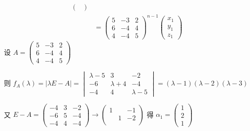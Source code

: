 \begin{align*}
\begin{pmatrix}
			                                                        \end{pmatrix}   \\
			                                   & = \begin{pmatrix}
				                                       5 & -3 & 2 \\
				                                       6 & -4 & 4 \\
				                                       4 & -4 & 5
			                                       \end{pmatrix}^{n-1}\begin{pmatrix}
				                                                          x_{1} \\
				                                                          y_{1} \\
				                                                          z_{1}
			                                                          \end{pmatrix}
		 \end{align*}
		 设 \( A = \begin{pmatrix}
			 5 & -3 & 2 \\
			 6 & -4 & 4 \\
			 4 & -4 & 5
		 \end{pmatrix} \)

		 则 \( f_{A}(\lambda) = |\lambda E - A| = \begin{vmatrix}
			 \lambda-5 & 3         & -2        \\
			 -6        & \lambda+4 & -4        \\
			 -4        & 4         & \lambda-5
		 \end{vmatrix} = (\lambda-1)(\lambda-2)(\lambda-3) \)

		 又 \( E-A = \begin{pmatrix}
			 -4 & 3 & -2 \\
			 -6 & 5 & -4 \\
			 -4 & 4 & -4
		 \end{pmatrix} \rightarrow \begin{pmatrix}
			 1 &   & -1 \\
			   & 1 & -2 \\
			   &   &
		 \end{pmatrix} \) 得 \( \alpha_{1} = \begin{pmatrix}
			 1 \\
			 2 \\
			 1
		 \end{pmatrix} \)

